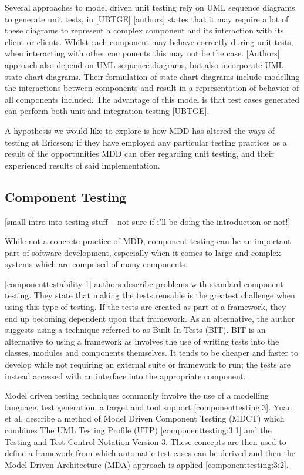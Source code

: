 \documentclass[fina_report_innit.tex]{subfiles}
\begin{document}
Several approaches to model driven unit testing rely on UML sequence diagrams to generate unit tests, in [UBTGE] [authors] states that it may require a lot of these diagrams to represent a complex component and its interaction with its client or clients. Whilst each component may behave correctly during unit tests, when interacting with other components this may not be the case. [Authors] approach also depend on UML sequence diagrams, but also incorporate UML state chart diagrams. Their formulation of state chart diagrams include modelling the interactions between components and result in a representation of behavior of all components included. The advantage of this model is that test cases generated can perform both unit and integration testing [UBTGE].

A hypothesis we would like to explore is how MDD has altered the ways of testing at Ericsson; if they have employed any particular testing practices as a result of the opportunities MDD can offer regarding unit testing, and their experienced results of said implementation. 

\subsection*{Component Testing}
[small intro into testing stuff – not sure if i'll be doing the introduction or not!]

While not a concrete practice of MDD, component testing can be an important part of software development, especially when it comes to large and complex systems which are comprised of many components.

[componenttestability 1] authors describe problems with standard component testing. They state that making the tests reusable is the greatest challenge when using this type of testing. If the tests are created as part of a framework, they end up becoming dependent upon that framework. As an alternative, the author suggests using a technique referred to as Built-In-Tests (BIT). BIT is an alternative to using a framework as involves the use of writing tests into the classes, modules and components themselves. It tends to be cheaper and faster to develop while not requiring an external suite or framework to run; the tests are instead accessed with an interface into the appropriate component.

Model driven testing techniques commonly involve the use of a modelling language, test generation, a target and tool support [componenttesting:3]. Yuan et al. describe a method of Model Driven Component Testing (MDCT) which combines The UML Testing Profile (UTP) [componenttesting:3:1] and the Testing and Test Control Notation Version 3. These concepts are then used to define a framework from which automatic test cases can be derived and then the Model-Driven Architecture (MDA) approach is applied [componenttesting:3:2]. 
\end{document}
